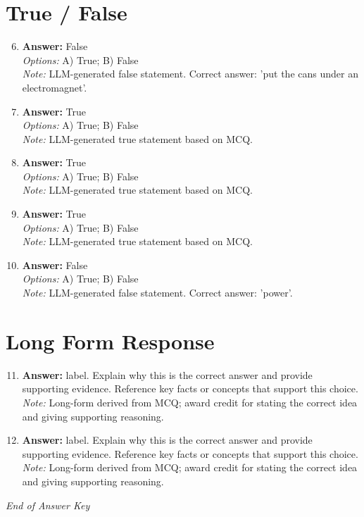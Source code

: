 \documentclass[12pt]{article}
\begin{document}
\section*{True / False}
\begin{enumerate}[label=\arabic*.]
\setcounter{enumi}{5}
\item \textbf{Answer:} False
\\ \textit{Options:} A) True; B) False
\\ \textit{Note:} LLM-generated false statement. Correct answer: 'put the cans under an electromagnet'.
\item \textbf{Answer:} True
\\ \textit{Options:} A) True; B) False
\\ \textit{Note:} LLM-generated true statement based on MCQ.
\item \textbf{Answer:} True
\\ \textit{Options:} A) True; B) False
\\ \textit{Note:} LLM-generated true statement based on MCQ.
\item \textbf{Answer:} True
\\ \textit{Options:} A) True; B) False
\\ \textit{Note:} LLM-generated true statement based on MCQ.
\item \textbf{Answer:} False
\\ \textit{Options:} A) True; B) False
\\ \textit{Note:} LLM-generated false statement. Correct answer: 'power'.
\end{enumerate}

\section*{Long Form Response}
\begin{enumerate}[label=\arabic*.]
\setcounter{enumi}{10}
\item \textbf{Answer:} label. Explain why this is the correct answer and provide supporting evidence. Reference key facts or concepts that support this choice.
\\ \textit{Note:} Long-form derived from MCQ; award credit for stating the correct idea and giving supporting reasoning.
\item \textbf{Answer:} label. Explain why this is the correct answer and provide supporting evidence. Reference key facts or concepts that support this choice.
\\ \textit{Note:} Long-form derived from MCQ; award credit for stating the correct idea and giving supporting reasoning.
\end{enumerate}

\vfill
\noindent\textit{End of Answer Key}
\end{document}
